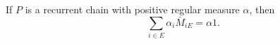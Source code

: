 If $P$ is a recurrent chain with positive regular measure $\alpha$, then
$$\sum_{i \in E} \alpha_i \bar{M}_{iE} = \alpha 1.$$
